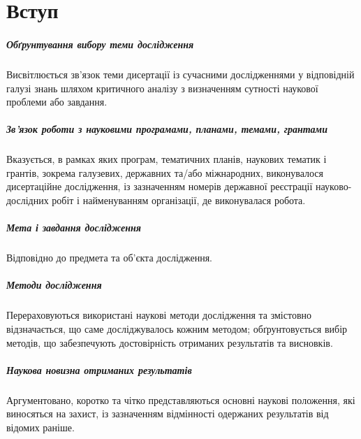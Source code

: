 
\chapter*{Вступ}

\paragraph{Обґрунтування вибору теми дослідження}

Висвітлюється зв'язок теми дисертації
із сучасними дослідженнями у відповідній галузі знань
шляхом критичного аналізу
з визначенням сутності наукової проблеми або завдання.

\paragraph{Зв'язок роботи з науковими програмами, планами, темами, грантами}

Вказується, в рамках яких програм, тематичних планів, наукових тематик і грантів,
зокрема галузевих, державних та/або міжнародних,
виконувалося дисертаційне дослідження,
із зазначенням номерів державної реєстрації науково-дослідних робіт
і найменуванням організації, де виконувалася робота.

\paragraph{Мета і завдання дослідження}

Відповідно до предмета та об'єкта дослідження.

\paragraph{Методи дослідження}

Перераховуються використані наукові методи дослідження
та змістовно відзначається, що саме досліджувалось кожним методом;
обґрунтовується вибір методів,
що забезпечують достовірність отриманих результатів та висновків.

\paragraph{Наукова новизна отриманих результатів}

Аргументовано, коротко та чітко представляються
основні наукові положення, які виносяться на захист,
із зазначенням відмінності одержаних результатів від відомих раніше.

